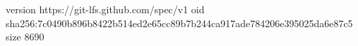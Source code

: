version https://git-lfs.github.com/spec/v1
oid sha256:7c0490b896b8422b514ed2e65cc89b7b244ca917ade784206e395025da6e87c5
size 8690
